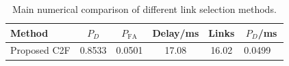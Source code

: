 \begin{table}[t]
    \centering
    \caption{Main numerical comparison of different link selection methods.}
    \label{tab:main_summary}
    \begin{tabular}{l c c c c c}
        \hline
        Method & $P_D$ & $P_{\mathrm{FA}}$ & Delay/ms & Links & $P_D$/ms \\
        \hline
        Proposed C2F & 0.8533 & 0.0501 & 17.08 & 16.02 & 0.0499 \
        \hline
    \end{tabular}
\end{table}
